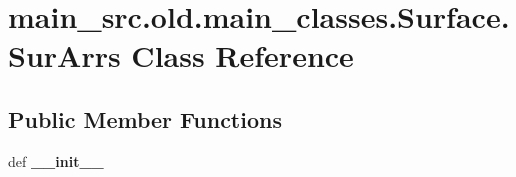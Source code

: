 \hypertarget{classmain__src_8old_1_1main__classes_1_1Surface_1_1SurArrs}{\section{main\-\_\-src.\-old.\-main\-\_\-classes.\-Surface.\-Sur\-Arrs Class Reference}
\label{classmain__src_8old_1_1main__classes_1_1Surface_1_1SurArrs}
}
\subsection*{Public Member Functions}
\begin{DoxyCompactItemize}
\item 
\hypertarget{classmain__src_8old_1_1main__classes_1_1Surface_1_1SurArrs_a653f99c3e167f9b3318e6919dd04206f}{def {\bfseries \-\_\-\-\_\-init\-\_\-\-\_\-}}\label{classmain__src_8old_1_1main__classes_1_1Surface_1_1SurArrs_a653f99c3e167f9b3318e6919dd04206f}

\end{DoxyCompactItemize}
